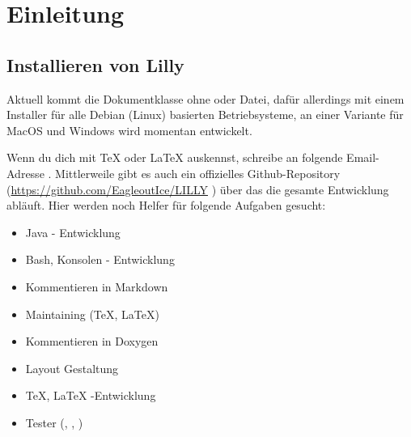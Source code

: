\chapter{Einleitung}
\section{Installieren von Lilly}
Aktuell kommt die Dokumentklasse ohne  oder  Datei, dafür allerdings mit einem Installer für alle Debian (Linux) basierten Betriebsysteme, an einer Variante für MacOS und Windows wird momentan entwickelt.

\begin{bemerkung}[Mithilfe]
    Wenn du dich mit \TeX{} oder \LaTeX{} auskennst, schreibe an folgende Email-Adresse \T{\AUTHORMAIL}.\smallskip\newline
    Mittlerweile gibt es auch ein offizielles Github-Repository (\url{https://github.com/EagleoutIce/LILLY} \href{https://github.com/EagleoutIce/LILLY}{\faGithub})
    über das die gesamte Entwicklung abläuft. Hier werden noch Helfer für folgende Aufgaben gesucht:
    \begin{multicols}{2}
        \begin{itemize}[label=$\diamond$]
            \item Java - Entwicklung
            \item Bash, Konsolen - Entwicklung
            \item Kommentieren in Markdown
            \item Maintaining (\TeX, \LaTeX)
            \item Kommentieren in Doxygen
            \item Layout Gestaltung
            \item \TeX, \LaTeX{} -Entwicklung
            \item Tester (\faLinux, \faApple, \faWindows)
        \end{itemize}
    \end{multicols}
\end{bemerkung}


